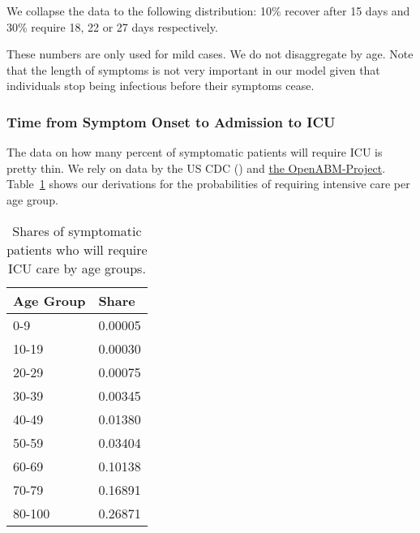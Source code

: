 We collapse the data to the following distribution: 10\% recover after 15 days and 30\%
require 18, 22 or 27 days respectively.

These numbers are only used for mild cases. We do not disaggregate by age. Note that the
length of symptoms is not very important in our model given that individuals stop being
infectious before their symptoms cease.


\subsubsection{Time from Symptom Onset to Admission to ICU}

The data on how many percent of symptomatic patients will require ICU is pretty thin. We
rely on data by the US CDC (\citet{Stokes2020}) and
\href{https://github.com/BDI-pathogens/OpenABM-Covid19/blob/572e24ca2dbf7153789a92ad3a27e4c515d0e576/documentation/parameters/parameter_dictionary.md}{the
OpenABM-Project}. Table~\ref{tab:symptomatic-to-ICU} shows our derivations for the
probabilities of requiring intensive care per age group.

\begin{table}[tb]
    \caption{Shares of symptomatic patients who will require ICU care by age groups.}
    \label{tab:symptomatic-to-ICU}
    \centering

    \begin{tabular}{ll}
        \toprule
        Age Group & Share \\
        \midrule
        0-9 & 0.00005 \\
        10-19 & 0.00030 \\
        20-29 & 0.00075 \\
        30-39 & 0.00345 \\
        40-49 & 0.01380 \\
        50-59 & 0.03404 \\
        60-69 & 0.10138 \\
        70-79 & 0.16891 \\
        80-100 & 0.26871 \\
        \bottomrule
    \end{tabular}


\end{table}


